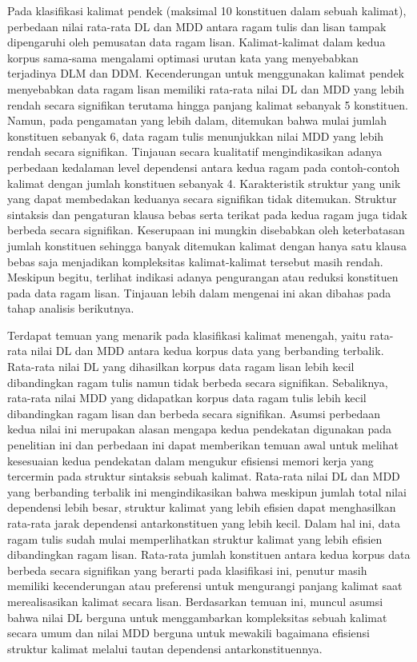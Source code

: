 Pada klasifikasi kalimat pendek (maksimal 10 konstituen dalam sebuah kalimat), perbedaan nilai rata-rata DL dan MDD antara ragam tulis dan lisan tampak dipengaruhi oleh pemusatan data ragam lisan. Kalimat-kalimat dalam kedua korpus sama-sama mengalami optimasi urutan kata yang menyebabkan terjadinya DLM dan DDM.  Kecenderungan untuk menggunakan kalimat pendek menyebabkan data ragam lisan memiliki rata-rata nilai DL dan MDD yang lebih rendah secara signifikan terutama hingga panjang kalimat sebanyak 5 konstituen. Namun, pada pengamatan yang lebih dalam, ditemukan bahwa mulai jumlah konstituen sebanyak 6, data ragam tulis menunjukkan nilai MDD yang lebih rendah secara signifikan. Tinjauan secara kualitatif mengindikasikan adanya perbedaan kedalaman level dependensi antara kedua ragam pada contoh-contoh kalimat dengan jumlah konstituen sebanyak 4. Karakteristik struktur yang unik yang dapat membedakan keduanya secara signifikan tidak ditemukan. Struktur sintaksis dan pengaturan klausa bebas serta terikat pada kedua ragam juga tidak berbeda secara signifikan. Keserupaan ini mungkin disebabkan oleh keterbatasan jumlah konstituen sehingga banyak ditemukan kalimat dengan hanya satu klausa bebas saja menjadikan kompleksitas kalimat-kalimat tersebut masih rendah. Meskipun begitu, terlihat indikasi adanya pengurangan atau reduksi konstituen pada data ragam lisan. Tinjauan lebih dalam mengenai ini akan dibahas pada tahap analisis berikutnya.

Terdapat temuan yang menarik pada klasifikasi kalimat menengah, yaitu rata-rata nilai DL dan MDD antara kedua korpus data yang berbanding terbalik. Rata-rata nilai DL yang dihasilkan korpus data ragam lisan lebih kecil dibandingkan ragam tulis namun tidak berbeda secara signifikan. Sebaliknya, rata-rata nilai MDD yang didapatkan korpus data ragam tulis lebih kecil dibandingkan ragam lisan dan berbeda secara signifikan. Asumsi perbedaan kedua nilai ini merupakan alasan mengapa kedua pendekatan digunakan pada penelitian ini dan perbedaan ini dapat memberikan temuan awal untuk melihat kesesuaian kedua pendekatan dalam mengukur efisiensi memori kerja yang tercermin pada struktur sintaksis sebuah kalimat. Rata-rata nilai DL dan MDD yang berbanding terbalik ini mengindikasikan bahwa meskipun jumlah total nilai dependensi lebih besar, struktur kalimat yang lebih efisien dapat menghasilkan rata-rata jarak dependensi antarkonstituen yang lebih kecil. Dalam hal ini, data ragam tulis sudah mulai memperlihatkan struktur kalimat yang lebih efisien dibandingkan ragam lisan. Rata-rata jumlah konstituen antara kedua korpus data berbeda secara signifikan yang berarti pada klasifikasi ini, penutur masih memiliki kecenderungan atau preferensi untuk mengurangi panjang kalimat saat merealisasikan kalimat secara lisan. Berdasarkan temuan ini, muncul asumsi bahwa nilai DL berguna untuk menggambarkan kompleksitas sebuah kalimat secara umum dan nilai MDD berguna untuk mewakili bagaimana efisiensi struktur kalimat melalui tautan dependensi antarkonstituennya.

